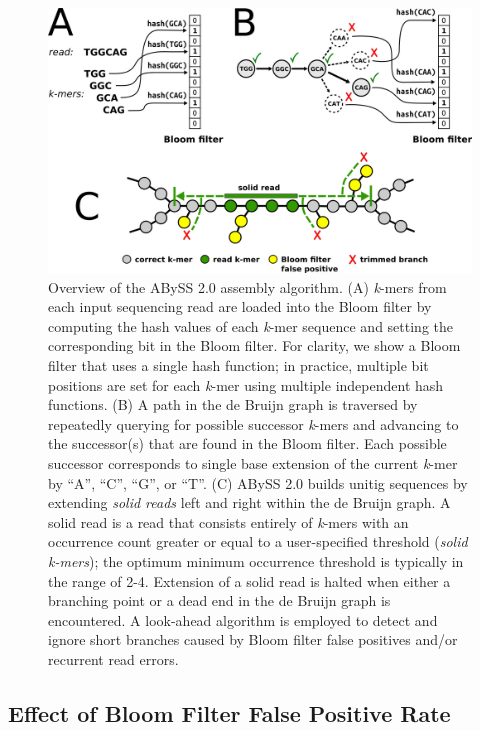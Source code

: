 \documentclass[
  12pt,
  oneside,
  openany]{book}
\begin{document}
\begin{figure}
\hypertarget{fig:bloom}{%
\centering
\includegraphics{abyss2/assembly-algorithm.png}
\caption[Overview of the ABySS 2.0 assembly algorithm.]{Overview of the ABySS 2.0 assembly algorithm. (A) \emph{k}-mers from each input sequencing read are loaded into the Bloom filter by computing the hash values of each \emph{k}-mer sequence and setting the corresponding bit in the Bloom filter. For clarity, we show a Bloom filter that uses a single hash function; in practice, multiple bit positions are set for each \emph{k}-mer using multiple independent hash functions. (B) A path in the de Bruijn graph is traversed by repeatedly querying for possible successor \emph{k}-mers and advancing to the successor(s) that are found in the Bloom filter. Each possible successor corresponds to single base extension of the current \emph{k}-mer by ``A'', ``C'', ``G'', or ``T''. (C) ABySS 2.0 builds unitig sequences by extending \emph{solid reads} left and right within the de Bruijn graph. A solid read is a read that consists entirely of \emph{k}-mers with an occurrence count greater or equal to a user-specified threshold (\emph{solid k-mers}); the optimum minimum occurrence threshold is typically in the range of 2-4. Extension of a solid read is halted when either a branching point or a dead end in the de Bruijn graph is encountered. A look-ahead algorithm is employed to detect and ignore short branches caused by Bloom filter false positives and/or recurrent read errors.}\label{fig:bloom}
}
\end{figure}

\hypertarget{effect-of-bloom-filter-false-positive-rate}{%
\subsection{Effect of Bloom Filter False Positive Rate}\label{effect-of-bloom-filter-false-positive-rate}}
\end{document}
